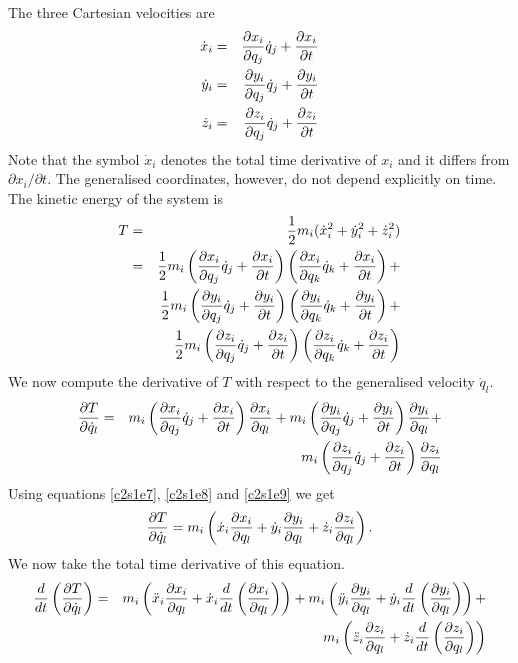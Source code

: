 The three Cartesian velocities are
\begin{eqnarray}
\dot{x}_i &=& \frac{\partial{x_i}}{\partial{q_j}}\dot{q}_j + \frac{\partial{x_i}}{\partial{t}} \label{c2s1e7} \\
\dot{y}_i &=& \frac{\partial{y_i}}{\partial{q_j}}\dot{q}_j + \frac{\partial{y_i}}{\partial{t}} \label{c2s1e8} \\
\dot{z}_i &=& \frac{\partial{z_i}}{\partial{q_j}}\dot{q}_j + \frac{\partial{z_i}}{\partial{t}} \label{c2s1e9}  
\end{eqnarray}
Note that the symbol $\dot{x}_i$ denotes the total time derivative of $x_i$ and
it differs from $\partial x_i/\partial t$. The generalised coordinates, however,
do not depend explicitly on time. The kinetic energy of the system is
\begin{eqnarray}
T &=& \frac{1}{2}m_i(\dot{x}_i^2 + \dot{y}_i^2 + \dot{z}_i^2) \nonumber \\
 &=& \frac{1}{2}m_i\left(\frac{\partial{x_i}}{\partial{q_j}}\dot{q}_j + \frac{\partial{x_i}}{\partial{t}}\right)
                   \left(\frac{\partial{x_i}}{\partial{q_k}}\dot{q}_k + \frac{\partial{x_i}}{\partial{t}}\right) + 
     \nonumber \\
 & & \frac{1}{2}m_i\left(\frac{\partial{y_i}}{\partial{q_j}}\dot{q}_j + \frac{\partial{y_i}}{\partial{t}}\right)
                   \left(\frac{\partial{y_i}}{\partial{q_k}}\dot{q}_k + \frac{\partial{y_i}}{\partial{t}}\right) + 
	 \nonumber \\
 & & \frac{1}{2}m_i\left(\frac{\partial{z_i}}{\partial{q_j}}\dot{q}_j + \frac{\partial{z_i}}{\partial{t}}\right)
                   \left(\frac{\partial{z_i}}{\partial{q_k}}\dot{q}_k + \frac{\partial{z_i}}{\partial{t}}\right) 
	 \label{c1s1e10} 
\end{eqnarray}
We now compute the derivative of $T$ with respect to the generalised 
velocity $\dot{q}_l$.
\begin{eqnarray}
\frac{\partial{T}}{\partial{\dot{q}_l}} &=& 
  m_i\left(\frac{\partial{x_i}}{\partial{q_j}}\dot{q}_j + \frac{\partial{x_i}}{\partial{t}}\right)\frac{\partial{x_i}}{\partial{q_l}} +
 m_i\left(\frac{\partial{y_i}}{\partial{q_j}}\dot{q}_j + \frac{\partial{y_i}}{\partial{t}}\right)\frac{\partial{y_i}}{\partial{q_l}} +
  \nonumber \\
& &  m_i\left(\frac{\partial{z_i}}{\partial{q_j}}\dot{q}_j + \frac{\partial{z_i}}{\partial{t}}\right)\frac{\partial{z_i}}{\partial{q_l}} 
  \label{c2s1e11} 
\end{eqnarray}
Using equations \eqref{c2s1e7}, \eqref{c2s1e8} and \eqref{c2s1e9} we get
\begin{equation}\label{c2s1e12}
\frac{\partial{T}}{\partial{\dot{q}_l}} = m_i\left(\dot{x}_i\frac{\partial{x_i}}{\partial{q_l}} + \dot{y}_i\frac{\partial{y_i}}{\partial{q_l}} + 
 \dot{z}_i\frac{\partial{z_i}}{\partial{q_l}}\right).
\end{equation}
We now take the total time derivative of this equation.
\begin{eqnarray}
\frac{d}{dt}\left(\frac{\partial{T}}{\partial{\dot{q}_l}}\right) &=& 
  m_i\left(\ddot{x}_i\frac{\partial{x_i}}{\partial{q_l}} + \dot{x}_i\frac{d}{dt}
  \left(\frac{\partial{x_i}}{\partial{q_l}}\right)\right)  + 
  m_i\left(\ddot{y}_i\frac{\partial{y_i}}{\partial{q_l}} + \dot{y}_i\frac{d}{dt}
  \left(\frac{\partial{y_i}}{\partial{q_l}}\right)\right) + \nonumber \\
& & m_i\left(\ddot{z}_i\frac{\partial{z_i}}{\partial{q_l}} + \dot{z}_i\frac{d}{dt}
  \left(\frac{\partial{z_i}}{\partial{q_l}}\right)\right) 
\end{eqnarray}
